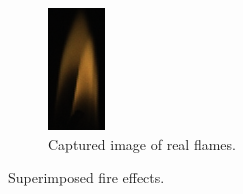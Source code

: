 \begin{figure}[h!]
        \begin{subfigure}[t]{0.135\textwidth}
                \includegraphics[width=\textwidth]{img/vox0087}
                \caption{Captured image of real flames.}
                \label{fig:vox0087}
        \end{subfigure}
        \caption{Superimposed fire effects.}
\end{figure}